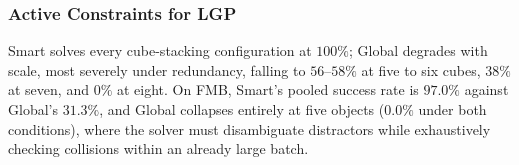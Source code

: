 \documentclass[letterpaper, 10 pt, conference]{ieeeconf}  %
\begin{document}

\subsubsection{Active Constraints for LGP}


Smart solves every cube-stacking configuration at $100\%$; Global degrades with scale, most severely under redundancy, falling to $56$--$58\%$ at five to six cubes, $38\%$ at seven, and $0\%$ at eight. 
On FMB, Smart's pooled success rate is $97.0\%$ against Global's $31.3\%$, and Global collapses entirely at five objects ($0.0\%$ under both conditions), where the solver must disambiguate distractors while exhaustively checking collisions within an already large batch. 
\end{document}
